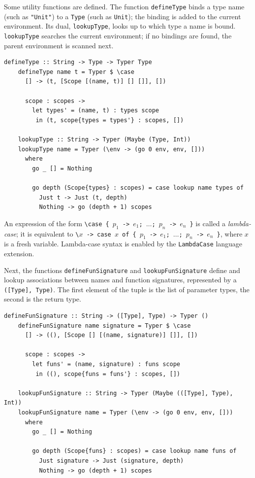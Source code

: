 \documentclass[UdineBachThesis,american,11pt]{PhdThesis}
\begin{document}
  Some utility functions are defined. The function \mbox{\texttt{defineType}}
  binds a type name (such as \mbox{\texttt{"Unit"}}) to a \mbox{\texttt{Type}}
  (such as \mbox{\texttt{Unit}}); the binding is added to the current
  environment. Its dual, \mbox{\texttt{lookupType}}, looks up to which type a
  name is bound. \mbox{\texttt{lookupType}} searches the current environment; if
  no bindings are found, the parent environment is scanned next.

  \begin{Verbatim}[gobble=4,fontsize=\small]
    defineType :: String -> Type -> Typer Type
    defineType name t = Typer $ \case
      [] -> (t, [Scope [(name, t)] [] []], [])

      scope : scopes ->
        let types' = (name, t) : types scope
         in (t, scope{types = types'} : scopes, [])

    lookupType :: String -> Typer (Maybe (Type, Int))
    lookupType name = Typer (\env -> (go 0 env, env, []))
      where
        go _ [] = Nothing

        go depth (Scope{types} : scopes) = case lookup name types of
          Just t -> Just (t, depth)
          Nothing -> go (depth + 1) scopes
  \end{Verbatim}

  An expression of the form
  \mbox{\texttt{\textbackslash case \{ $p_1$ -> $e_1$; $\ldots$; $p_n$ -> $e_n$ \}}}
  is called a \emph{lambda-case}; it is equivalent to
  \mbox{\texttt{\textbackslash $x$ -> case $x$ of \{ $p_1$ -> $e_1$; $\ldots$; $p_n$ -> $e_n$ \}}},
  where $x$ is a fresh variable. Lambda-case syntax is enabled by the
  \mbox{\texttt{LambdaCase}} language extension.

  Next, the functions \mbox{\texttt{defineFunSignature}} and
  \mbox{\texttt{lookupFunSignature}} define and lookup associations between
  names and function signatures, represented by a
  \mbox{\texttt{([Type], Type)}}. The first element of the tuple is the list of
  parameter types, the second is the return type.

  \pagebreak

  \begin{Verbatim}[gobble=4,fontsize=\small]
    defineFunSignature :: String -> ([Type], Type) -> Typer ()
    defineFunSignature name signature = Typer $ \case
      [] -> ((), [Scope [] [(name, signature)] []], [])

      scope : scopes ->
        let funs' = (name, signature) : funs scope
         in ((), scope{funs = funs'} : scopes, [])

    lookupFunSignature :: String -> Typer (Maybe (([Type], Type), Int))
    lookupFunSignature name = Typer (\env -> (go 0 env, env, []))
      where
        go _ [] = Nothing

        go depth (Scope{funs} : scopes) = case lookup name funs of
          Just signature -> Just (signature, depth)
          Nothing -> go (depth + 1) scopes
  \end{Verbatim}
\end{document}
